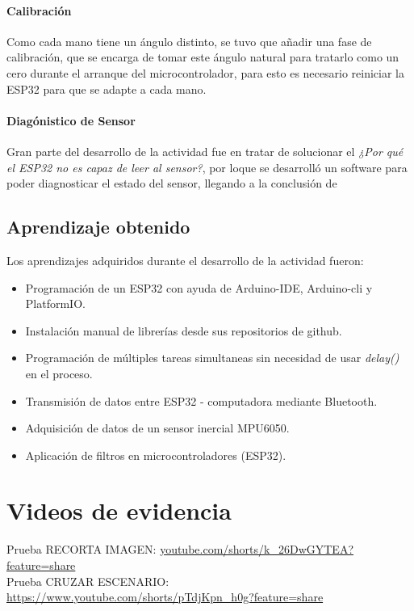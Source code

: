 \documentclass[conference]{IEEEtran}
\begin{document}
  \paragraph{Calibración} Como cada mano tiene un ángulo distinto, se tuvo que añadir una fase de calibración, que se encarga de tomar este ángulo natural para tratarlo como un cero durante el arranque del microcontrolador, para esto es necesario reiniciar la ESP32 para que se adapte a cada mano.
  \paragraph{Diagónistico de Sensor} Gran parte del desarrollo de la actividad fue en tratar de solucionar el \textit{¿Por qué el ESP32 no es capaz de leer al sensor?}, por loque se desarrolló un software para poder diagnosticar el estado del sensor, llegando a la conclusión de
  
  \subsection{Aprendizaje obtenido}
  Los aprendizajes adquiridos durante el desarrollo de la actividad fueron:
  \begin{itemize}
    \item Programación de un ESP32 con ayuda de Arduino-IDE, Arduino-cli y PlatformIO.
    \item Instalación manual de librerías desde sus repositorios de github.
    \item Programación de múltiples tareas simultaneas sin necesidad de usar \textit{delay()} en el proceso.
    \item Transmisión de datos entre ESP32 - computadora mediante Bluetooth.
    \item Adquisición de datos de un sensor inercial MPU6050.
    \item Aplicación de filtros en microcontroladores (ESP32).
  \end{itemize}

\section{Videos de evidencia}

Prueba RECORTA IMAGEN: \url{youtube.com/shorts/k_26DwGYTEA?feature=share} \\
Prueba CRUZAR ESCENARIO: \url{https://www.youtube.com/shorts/pTdjKpn_h0g?feature=share}


\printbibliography
\end{document}
